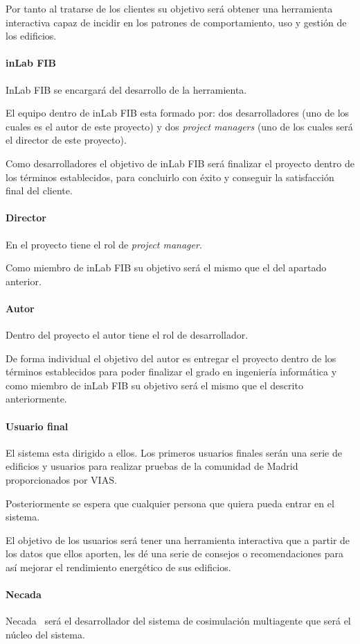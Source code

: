 Por tanto al tratarse de los clientes su objetivo será obtener una herramienta interactiva capaz de incidir en los patrones de comportamiento, uso y gestión de los edificios. 
\paragraph{inLab FIB}
InLab FIB se encargará del desarrollo de la herramienta.

El equipo dentro de inLab FIB esta formado por: dos desarrolladores (uno de los cuales es el autor de este proyecto) y dos \textit{project managers} (uno de los cuales será el director de este proyecto).

Como desarrolladores el objetivo de inLab FIB será finalizar el proyecto dentro de los términos establecidos, para concluirlo con éxito y conseguir la satisfacción final del cliente.

\paragraph{Director}
En el proyecto tiene el rol de \textit{project manager}.

Como miembro de inLab FIB su objetivo será el mismo que el del apartado anterior.
\paragraph{Autor}
Dentro del proyecto el autor tiene el rol de desarrollador.

De forma individual el objetivo del autor es entregar el proyecto dentro de los términos establecidos para poder finalizar el grado en ingeniería informática y como miembro de inLab FIB su objetivo será el mismo que el descrito anteriormente.
\paragraph{Usuario final}
El sistema esta dirigido a ellos. Los primeros usuarios finales serán una serie de edificios y usuarios para realizar pruebas de la comunidad de Madrid proporcionados por VIAS.

Posteriormente se espera que cualquier persona que quiera pueda entrar en el sistema.

El objetivo de los usuarios será tener una herramienta interactiva que a partir de los datos que ellos aporten, les dé una serie de consejos o recomendaciones para así mejorar el rendimiento energético de sus edificios.
\paragraph{Necada}
Necada~\cite{necada} será el desarrollador del sistema de cosimulación multiagente que será el núcleo del sistema.


